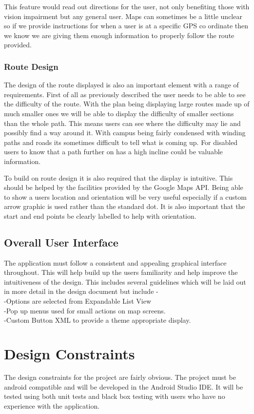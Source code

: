 \documentclass[10pt,a4paper]{article}
\begin{document}
This feature would read out directions for the user, not only benefiting those with vision impairment but any general user. Maps can sometimes be a little unclear so if we provide instructions for when a user is at a specific GPS co ordinate then we know we are giving them enough information to properly follow the route provided. 
\subsubsection{Route Design}
The design of the route displayed is also an important element with a range of requirements. First of all as previously described the user needs to be able to see the difficulty of the route. With the plan being displaying large routes made up of much smaller ones we will be able to display the difficulty of smaller sections than the whole path. This means users can see where the difficulty may lie and possibly find a way around it. With campus being fairly condensed with winding paths and roads its sometimes difficult to tell what is coming up. For disabled users to know that a path further on has a high incline could be valuable information. 

To build on route design it is also required that the display is intuitive. This should be helped by the facilities provided by the Google Maps API. Being able to show a users location and orientation will be very useful especially if a custom arrow graphic is used rather than the standard dot. It is also important that the start and end points be clearly labelled to help with orientation. 
\newpage
\subsection{Overall User Interface}
The application must follow a consistent and appealing graphical interface throughout. This will help build up the users familiarity and help improve the intuitiveness of the design. This includes several guidelines which will be laid out in more detail in the design document but include -\\ 
	-Options are selected from Expandable List View\\
	-Pop up menus used for small actions on map screens.\\
	-Custom Button XML to provide a theme appropriate     display.
\section{Design Constraints}
The design constraints for the project are fairly obvious. The project must be android compatible and will be developed in the Android Studio IDE. It will be tested using both unit tests and black box testing with users who have no experience with the application. 
\end{document}
